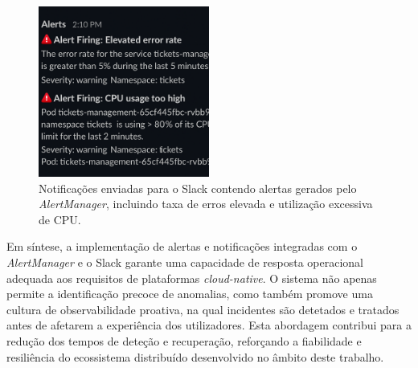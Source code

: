 \begin{figure}[H]
    \centering
    \includegraphics[width=0.5\textwidth]{images/Grafana/alertas.png}
    \caption{Notificações enviadas para o Slack contendo alertas gerados pelo \textit{AlertManager}, incluindo taxa de erros elevada e utilização excessiva de CPU.}
    \label{fig:slack-alerts}
\end{figure}

Em síntese, a implementação de alertas e notificações integradas com o \textit{AlertManager} e o Slack garante uma capacidade de resposta operacional adequada aos requisitos de plataformas \textit{cloud-native}. O sistema não apenas permite a identificação precoce de anomalias, como também promove uma cultura de observabilidade proativa, na qual incidentes são detetados e tratados antes de afetarem a experiência dos utilizadores. Esta abordagem contribui para a redução dos tempos de deteção e recuperação, reforçando a fiabilidade e resiliência do ecossistema distribuído desenvolvido no âmbito deste trabalho.



